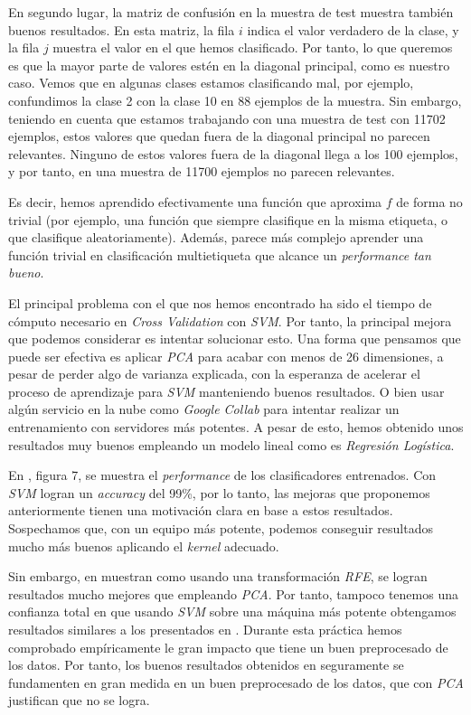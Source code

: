 \documentclass[11pt]{article}
\begin{document}
En segundo lugar, la matriz de confusión en la muestra de test muestra también buenos resultados. En esta matriz, la fila $i$ indica el valor verdadero de la clase, y la fila $j$ muestra el valor en el que hemos clasificado. Por tanto, lo que queremos es que la mayor parte de valores estén en la diagonal principal, como es nuestro caso. Vemos que en algunas clases estamos clasificando mal, por ejemplo, confundimos la clase 2 con la clase 10 en 88 ejemplos de la muestra. Sin embargo, teniendo en cuenta que estamos trabajando con una muestra de test con 11702 ejemplos, estos valores que quedan fuera de la diagonal principal no parecen relevantes. Ninguno de estos valores fuera de la diagonal llega a los 100 ejemplos, y por tanto, en una muestra de 11700 ejemplos no parecen relevantes.

Es decir, hemos aprendido efectivamente una función que aproxima $f$ de forma no trivial (por ejemplo, una función que siempre clasifique en la misma etiqueta, o que clasifique aleatoriamente). Además, parece más complejo aprender una función trivial en clasificación multietiqueta que alcance un \emph{performance tan bueno}.

El principal problema con el que nos hemos encontrado ha sido el tiempo de cómputo necesario en \emph{Cross Validation} con \emph{SVM}. Por tanto, la principal mejora que podemos considerar es intentar solucionar esto. Una forma que pensamos que puede ser efectiva es aplicar \emph{PCA} para acabar con menos de 26 dimensiones, a pesar de perder algo de varianza explicada, con la esperanza de acelerar el proceso de aprendizaje para \emph{SVM} manteniendo buenos resultados. O bien usar algún servicio en la nube como \emph{Google Collab} para intentar realizar un entrenamiento con servidores más potentes. A pesar de esto, hemos obtenido unos resultados muy buenos empleando un modelo lineal como es \emph{Regresión Logística}.

En \cite{paper_clasificacion_1:paper}, figura 7, se muestra el \emph{performance} de los clasificadores entrenados. Con \emph{SVM} logran un \emph{accuracy} del 99\%, por lo tanto, las mejoras que proponemos anteriormente tienen una motivación clara en base a estos resultados. Sospechamos que, con un equipo más potente, podemos conseguir resultados mucho más buenos aplicando el \emph{kernel} adecuado.

Sin embargo, en \cite{paper_clasificacion_1:paper} muestran como usando una transformación \emph{RFE}, se logran resultados mucho mejores que empleando \emph{PCA}. Por tanto, tampoco tenemos una confianza total en que usando \emph{SVM} sobre una máquina más potente obtengamos resultados similares a los presentados en \cite{paper_clasificacion_1:paper}. Durante esta práctica hemos comprobado empíricamente le gran impacto que tiene un buen preprocesado de los datos. Por tanto, los buenos resultados obtenidos en \cite{paper_clasificacion_1:paper} seguramente se fundamenten en gran medida en un buen preprocesado de los datos, que con \emph{PCA} justifican que no se logra.
\end{document}
